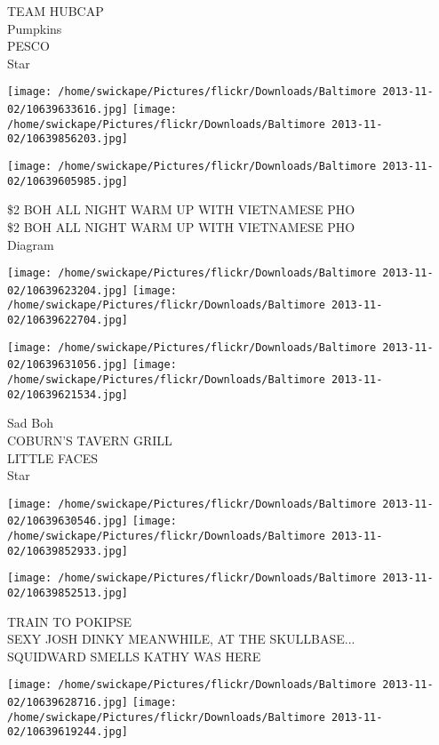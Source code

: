 \documentclass[10pt,letterpaper]{article}
\begin{document}
TEAM HUBCAP\\
Pumpkins\\
PESCO\\
Star\\
\pagebreak

\texttt{[image: /home/swickape/Pictures/flickr/Downloads/Baltimore 2013-11-02/10639633616.jpg]}
\texttt{[image: /home/swickape/Pictures/flickr/Downloads/Baltimore 2013-11-02/10639856203.jpg]}

\vspace{0.25in}
\texttt{[image: /home/swickape/Pictures/flickr/Downloads/Baltimore 2013-11-02/10639605985.jpg]}

\$2 BOH ALL NIGHT WARM UP WITH VIETNAMESE PHO\\
\$2 BOH ALL NIGHT WARM UP WITH VIETNAMESE PHO\\
Diagram\\
\pagebreak

\texttt{[image: /home/swickape/Pictures/flickr/Downloads/Baltimore 2013-11-02/10639623204.jpg]}
\texttt{[image: /home/swickape/Pictures/flickr/Downloads/Baltimore 2013-11-02/10639622704.jpg]}

\texttt{[image: /home/swickape/Pictures/flickr/Downloads/Baltimore 2013-11-02/10639631056.jpg]}
\texttt{[image: /home/swickape/Pictures/flickr/Downloads/Baltimore 2013-11-02/10639621534.jpg]}

Sad Boh\\
COBURN'S TAVERN GRILL\\
LITTLE FACES\\
Star\\
\pagebreak

\texttt{[image: /home/swickape/Pictures/flickr/Downloads/Baltimore 2013-11-02/10639630546.jpg]}
\texttt{[image: /home/swickape/Pictures/flickr/Downloads/Baltimore 2013-11-02/10639852933.jpg]}

\vspace{0.25in}
\texttt{[image: /home/swickape/Pictures/flickr/Downloads/Baltimore 2013-11-02/10639852513.jpg]}

TRAIN TO POKIPSE\\
SEXY JOSH DINKY MEANWHILE, AT THE SKULLBASE...\\
SQUIDWARD SMELLS KATHY WAS HERE\\
\pagebreak

\texttt{[image: /home/swickape/Pictures/flickr/Downloads/Baltimore 2013-11-02/10639628716.jpg]}
\texttt{[image: /home/swickape/Pictures/flickr/Downloads/Baltimore 2013-11-02/10639619244.jpg]}
\end{document}
